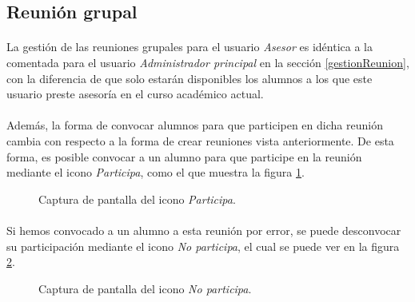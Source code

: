 \subsection{Reunión grupal}

  \paragraph{}La gestión de las reuniones grupales para el usuario
  \textit{Asesor} es idéntica a la comentada para el usuario
  \textit{Administrador principal} en la sección \ref{gestionReunion},
  con la diferencia de que solo estarán disponibles los alumnos a los que
  este usuario preste asesoría en el curso académico actual.

  \paragraph{}Además, la forma de convocar alumnos para que participen en dicha
  reunión cambia con respecto a la forma de crear reuniones vista anteriormente.
  De esta forma, es posible convocar a un alumno para que participe en la
  reunión mediante el icono \textit{Participa}, como el que muestra la figura
  \ref{capturaIconoParticipa}.

  \begin{figure}[!ht]
    \begin{center}
      \caption{Captura de pantalla del icono \textit{Participa}.}
      \label{capturaIconoParticipa}
    \end{center}
  \end{figure}

  \paragraph{}Si hemos convocado a un alumno a esta reunión por error, se puede
  desconvocar su participación mediante el icono \textit{No participa}, el cual
  se puede ver en la figura \ref{capturaIconoNoParticipa}.

  \begin{figure}[!ht]
    \begin{center}
      \caption{Captura de pantalla del icono \textit{No participa}.}
      \label{capturaIconoNoParticipa}
    \end{center}
  \end{figure}

